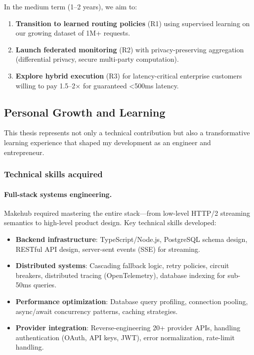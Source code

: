 \documentclass[english]{article}
\begin{document}
In the medium term (1--2 years), we aim to:
\begin{enumerate}
    \item \textbf{Transition to learned routing policies} (R1) using supervised learning on our growing dataset of 1M+ requests.
    \item \textbf{Launch federated monitoring} (R2) with privacy-preserving aggregation (differential privacy, secure multi-party computation).
    \item \textbf{Explore hybrid execution} (R3) for latency-critical enterprise customers willing to pay 1.5--2× for guaranteed <500ms latency.
\end{enumerate}

\subsection{Personal Growth and Learning}

This thesis represents not only a technical contribution but also a transformative learning experience that shaped my development as an engineer and entrepreneur.

\subsubsection{Technical skills acquired}

\paragraph{Full-stack systems engineering.}

Makehub required mastering the entire stack—from low-level HTTP/2 streaming semantics to high-level product design. Key technical skills developed:
\begin{itemize}
    \item \textbf{Backend infrastructure}: TypeScript/Node.js, PostgreSQL schema design, RESTful API design, server-sent events (SSE) for streaming.
    \item \textbf{Distributed systems}: Cascading fallback logic, retry policies, circuit breakers, distributed tracing (OpenTelemetry), database indexing for sub-50ms queries.
    \item \textbf{Performance optimization}: Database query profiling, connection pooling, async/await concurrency patterns, caching strategies.
    \item \textbf{Provider integration}: Reverse-engineering 20+ provider APIs, handling authentication (OAuth, API keys, JWT), error normalization, rate-limit handling.
\end{itemize}
\end{document}

